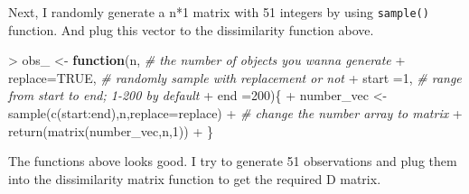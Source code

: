 \documentclass[
]{article}
\newenvironment{Shaded}{\begin{snugshade}}{\end{snugshade}}
\newcommand{\AttributeTok}[1]{\textcolor[rgb]{0.77,0.63,0.00}{#1}}
\newcommand{\CommentTok}[1]{\textcolor[rgb]{0.56,0.35,0.01}{\textit{#1}}}
\newcommand{\ConstantTok}[1]{\textcolor[rgb]{0.00,0.00,0.00}{#1}}
\newcommand{\ControlFlowTok}[1]{\textcolor[rgb]{0.13,0.29,0.53}{\textbf{#1}}}
\newcommand{\DecValTok}[1]{\textcolor[rgb]{0.00,0.00,0.81}{#1}}
\newcommand{\FunctionTok}[1]{\textcolor[rgb]{0.00,0.00,0.00}{#1}}
\newcommand{\NormalTok}[1]{#1}
\newcommand{\OtherTok}[1]{\textcolor[rgb]{0.56,0.35,0.01}{#1}}
\newcommand{\SpecialCharTok}[1]{\textcolor[rgb]{0.00,0.00,0.00}{#1}}
\begin{document}
Next, I randomly generate a n*1 matrix with 51 integers by using
\texttt{sample()} function. And plug this vector to the dissimilarity
function above.

\begin{Shaded}
\begin{Highlighting}[]
\SpecialCharTok{\textgreater{}}\NormalTok{ obs\_ }\OtherTok{\textless{}{-}} \ControlFlowTok{function}\NormalTok{(n, }\CommentTok{\# the number of objects you wanna generate}
\SpecialCharTok{+}                      \AttributeTok{replace=}\ConstantTok{TRUE}\NormalTok{, }\CommentTok{\# randomly sample with replacement or not}
\SpecialCharTok{+}                      \AttributeTok{start =}\DecValTok{1}\NormalTok{,  }\CommentTok{\# range from start to end; 1{-}200 by default}
\SpecialCharTok{+}                      \AttributeTok{end =}\DecValTok{200}\NormalTok{)\{}
\SpecialCharTok{+}\NormalTok{   number\_vec }\OtherTok{\textless{}{-}} \FunctionTok{sample}\NormalTok{(}\FunctionTok{c}\NormalTok{(start}\SpecialCharTok{:}\NormalTok{end),n,}\AttributeTok{replace=}\NormalTok{replace)}
\SpecialCharTok{+}   \CommentTok{\# change the number array to matrix}
\SpecialCharTok{+}   \FunctionTok{return}\NormalTok{(}\FunctionTok{matrix}\NormalTok{(number\_vec,n,}\DecValTok{1}\NormalTok{))}
\SpecialCharTok{+}\NormalTok{ \}}
\end{Highlighting}
\end{Shaded}

The functions above looks good. I try to generate 51 observations and
plug them into the dissimilarity matrix function to get the required D
matrix.
\end{document}
